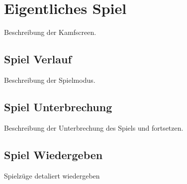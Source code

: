 \documentclass[fontsize=12pt,paper=a4,twoside]{scrartcl}
\begin{document}
\section{Eigentliches Spiel}
Beschreibung der Kamfscreen.

\subsection{Spiel Verlauf}
Beschreibung der Spielmodus.


\subsection{Spiel Unterbrechung}
Beschreibung der Unterbrechung des Spiels und fortsetzen.



\subsection{Spiel Wiedergeben}
Spielzüge detaliert wiedergeben
\end{document}
